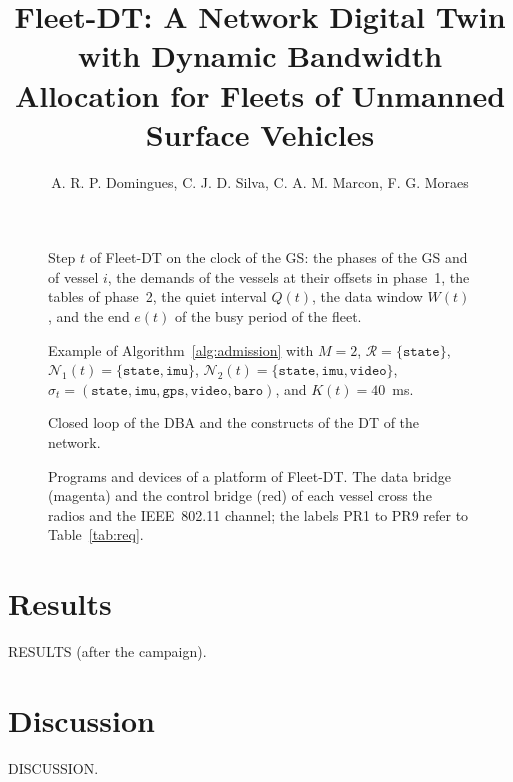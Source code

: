 \documentclass[journal]{IEEEtran}
\begin{document}
\title{Fleet-DT: A Network Digital Twin with Dynamic Bandwidth Allocation for Fleets of Unmanned Surface Vehicles}
\author{A. R. P. Domingues, C. J. D. Silva, C. A. M. Marcon, F. G. Moraes}
\maketitle





\begin{figure}[t]\centering\resizebox{\columnwidth}{!}{}\caption{Step $t$ of Fleet-DT on the clock of the GS: the phases of the GS and of vessel $i$, the demands of the vessels at their offsets in phase~1, the tables of phase~2, the quiet interval $Q(t)$, the data window $W(t)$, and the end $e(t)$ of the busy period of the fleet.}\label{fig:step}\end{figure}

\begin{figure}[t]\centering\footnotesize\resizebox{\columnwidth}{!}{}\caption{Example of Algorithm~\ref{alg:admission} with $M = 2$, $\mathcal{R} = \{\texttt{state}\}$, $\mathcal{N}_1(t) = \{\texttt{state}, \texttt{imu}\}$, $\mathcal{N}_2(t) = \{\texttt{state}, \texttt{imu}, \texttt{video}\}$, $\sigma_t = (\texttt{state}, \texttt{imu}, \texttt{gps}, \texttt{video}, \texttt{baro})$, and $K(t) = 40$~ms.}\label{fig:alg}\end{figure}
\begin{figure}[t]\centering\resizebox{0.85\textwidth}{!}{}\caption{Closed loop of the DBA and the constructs of the DT of the network.}\label{fig:loop}\end{figure}

\begin{figure}[t]\centering\resizebox{0.8\textwidth}{!}{}\caption{Programs and devices of a platform of Fleet-DT. The data bridge (magenta) and the control bridge (red) of each vessel cross the radios and the IEEE~802.11 channel; the labels PR1 to PR9 refer to Table~\ref{tab:req}.}\label{fig:deploy}\end{figure}

\section{Results}\label{sec:results}
RESULTS (after the campaign). \newpage \mbox{} \newpage \mbox{}
\section{Discussion}\label{sec:discussion}
DISCUSSION. \newpage


\end{document}
